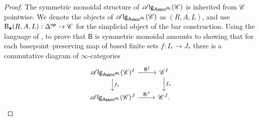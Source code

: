 \documentclass[../text]{subfiles}
\begin{document}
\begin{proof}
    The symmetric monoidal structure of $\mathscr{A} \mathsf{lg}_{\mathsf{Assoc^{RL}}} (\mathscr{C})$ is inherited from $\mathscr{C}$ pointwise. We denote the objects of $\mathscr{A} \mathsf{lg}_{\mathsf{Assoc^{RL}}} (\mathscr{C})$ as $(R,A,L)$, and use $\mathsf{B}_{\bullet} (R, A, L):\Delta^{\mathsf{op}} \rightarrow \mathscr{C}$ for the simplicial object of the bar construction. Using the language of \cite[def.2.1.2.7]{lurie_ha}, to prove that $\mathsf{B}$ is symmetric monoidal amounts to showing that for each basepoint--preserving map of based finite sets $f: I_* \xrightarrow{} J_*$ there is a commutative diagram of $\infty$-categories
    \begin{equation}
        \begin{tikzcd}
            \alg{\mathsf{Assoc^{RL}}} (\catC)^I \arrow[r, "\mathsf{B}^I"] \arrow[d, "f_*"] & \catC^I \arrow[d, "f_*"] \\
            \alg{\mathsf{Assoc^{RL}}} (\catC)^J \arrow[r, "\mathsf{B}^J"] & \catC^J.
        \end{tikzcd}
    \end{equation}
    

\end{proof}
\end{document}
